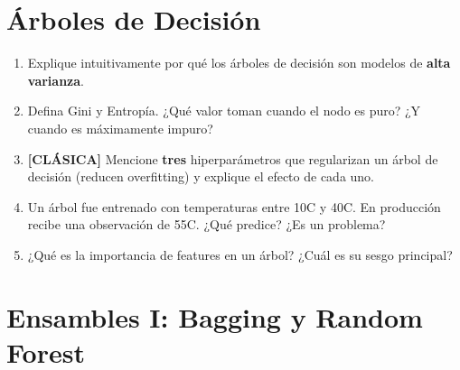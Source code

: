 \documentclass[11pt,a4paper]{article}
\begin{document}
\section{\'Arboles de Decisi\'on}

\begin{enumerate}[label=\textbf{P\arabic*.}, resume]

\item Explique intuitivamente por qu\'e los \'arboles de decisi\'on son modelos de
  \textbf{alta varianza}.

\item Defina Gini y Entrop\'ia. ¿Qu\'e valor toman cuando el nodo es puro? ¿Y cuando es
  m\'aximamente impuro?

\item \leavevmode

\begin{classicbox}
\textcolor{tdred}{\textbf{[CL\'ASICA]}} Mencione \textbf{tres} hiperpar\'ametros que
regularizan un \'arbol de decisi\'on (reducen overfitting) y explique el efecto de cada
uno.
\end{classicbox}

\item Un \'arbol fue entrenado con temperaturas entre 10\textdegree C y 40\textdegree C.
  En producci\'on recibe una observaci\'on de 55\textdegree C. ¿Qu\'e predice? ¿Es un
  problema?

\item ¿Qu\'e es la importancia de features en un \'arbol? ¿Cu\'al es su sesgo principal?

\end{enumerate}

\section{Ensambles I: Bagging y Random Forest}
\end{document}

